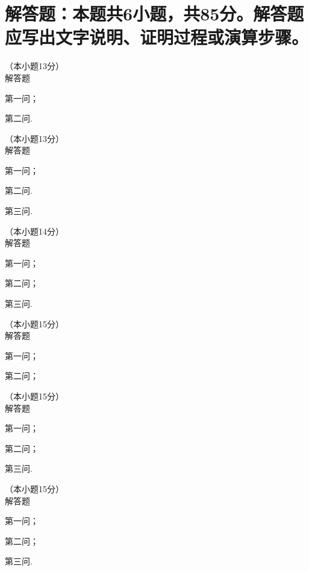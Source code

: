 \documentclass[12pt, a4paper]{article}
\begin{document}
\section{解答题：本题共\textmd{\textrm{6}}小题，共\textmd{\textrm{85}}分。解答题应写出文字说明、证明过程或演算步骤。}
\begin{question}[resume]
    \item （本小题13分） \\
    解答题
    \begin{question}
        \item 第一问；
        \item 第二问.
    \end{question}
    
    \item （本小题13分） \\
    解答题
    \begin{question}
        \item 第一问；
        \item 第二问.
        \item 第三问.
    \end{question}
    
    \item （本小题14分） \\
    解答题
    \begin{question}
        \item 第一问；
        \item 第二问；
        \item 第三问.
    \end{question}
    
    \item （本小题15分） \\
    解答题
    \begin{question}
        \item 第一问；
        \item 第二问；
    \end{question}
    
    \item （本小题15分） \\
    解答题
    \begin{question}
        \item 第一问；
        \item 第二问；
        \item 第三问.
    \end{question}
    
    \item （本小题15分） \\
    解答题
    \begin{question}
        \item 第一问；
        \item 第二问；
        \item 第三问.
    \end{question}
\end{question}
\end{document}

